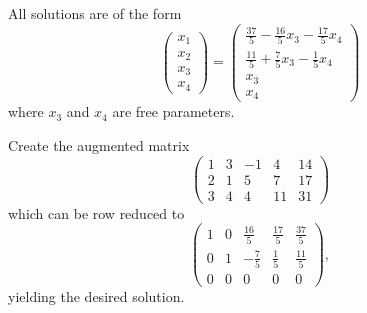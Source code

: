 \ans All solutions are of the form
\[ \left(\begin{array}{r} x_1 \\ x_2 \\ x_3 \\ x_4\end{array}\right) =
\left(\begin{array}{c} \frac{37}{5} - \frac{16}{5}x_3 - \frac{17}{5}x_4 \\
\frac{11}{5} + \frac{7}{5}x_3 - \frac{1}{5}x_4 \\ x_3 \\ x_4\end{array}\right)
\]
where $x_3$ and $x_4$ are free parameters.

\soln Create the augmented matrix
\[ \left(\begin{array}{rrrr|r}
1 & 3 & -1 & 4 & 14 \\
2 & 1 & 5 & 7 & 17 \\
3 & 4 & 4 & 11 & 31\end{array}\right) \]
which can be row reduced to
\[ \left(\begin{array}{rrrr|r}
1 & 0 & \frac{16}{5} & \frac{17}{5} & \frac{37}{5} \\
0 & 1 & -\frac{7}{5} & \frac{1}{5} & \frac{11}{5} \\
0 & 0 & 0 & 0 & 0\end{array}\right), \]
yielding the desired solution.

